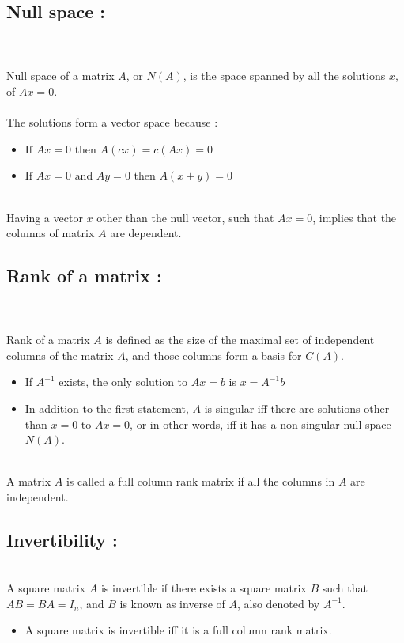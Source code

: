 \documentclass[12pt]{article}
\begin{document}
\subsection{Null space :}\\ \\
Null space of a matrix $A$, or $N(A)$, is the space spanned by all the solutions $x$, of $Ax = 0$.
\\ \\
The solutions form a vector space because :
\begin{itemize}
    \item $\text{If } Ax = 0 \text{ then } A(cx) = c(Ax) = 0$ 
    \item $\text{If } Ax = 0 \text{ and } Ay = 0 \text{ then } A(x + y) = 0$
\end{itemize}
\\
Having a vector $x$ other than the null vector, such that $Ax = 0$, implies that the columns of matrix $A$ are dependent.

\subsection{Rank of a matrix :} \\\\
Rank of a matrix $A$ is defined as the size of the maximal set of independent columns of the matrix $A$, and those columns form a basis for $C(A)$.

\begin{itemize}
    \item If $A^{-1}$ exists, the only solution to $Ax = b$ is $x = A^{-1}b$
    \item In addition to the first statement, $A$ is singular iff there are solutions other than $x = 0$ to $Ax = 0$, or in other words, iff it has a non-singular null-space $N(A)$.
\end{itemize}
\\A matrix $A$ is called a full column rank matrix if all the columns in $A$ are independent.

\subsection{Invertibility :}\\
A square matrix $A$ is invertible if there exists a square matrix $B$ such that $AB = BA = I_{n}$, and $B$ is known as inverse of $A$, also denoted by $A^{-1}$.
\begin{itemize}
    \item A square matrix is invertible iff it is a full column rank matrix.
\end{itemize}
\end{document}
